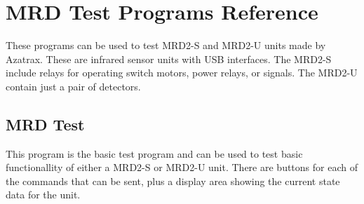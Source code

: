 
\chapter{MRD Test Programs Reference}
\label{chpt:mrdtest:Reference}

These programs can be used to test MRD2-S and MRD2-U units made by
Azatrax. These are infrared sensor units with USB interfaces.  The
MRD2-S include relays for operating switch motors, power relays, or
signals. The MRD2-U contain just a pair of detectors.

\section{MRD Test}

This program is the basic test program and can be used to test basic
functionallity of either a MRD2-S or MRD2-U unit.  There are buttons for
each of the commands that can be sent, plus a display area showing the
current state data for the unit.

